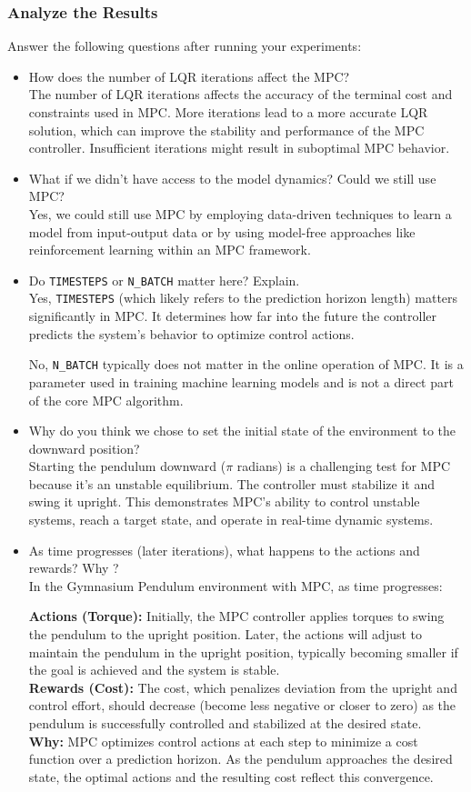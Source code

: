 \subsubsection{Analyze the Results} 
Answer the following questions after running your experiments: 
\begin{itemize} 
    \item How does the number of LQR iterations affect the MPC? \\
    The number of LQR iterations affects the accuracy of the terminal cost and constraints used in MPC. More iterations lead to a more accurate LQR solution, which can improve the stability and performance of the MPC controller. Insufficient iterations might result in suboptimal MPC behavior.
    \item What if we didn't have access to the model dynamics? Could we still use MPC? \\
    Yes, we could still use MPC by employing data-driven techniques to learn a model from input-output data or by using model-free approaches like reinforcement learning within an MPC framework.
    \item Do \texttt{TIMESTEPS} or \texttt{N\_BATCH} matter here? Explain.\\Yes, \texttt{TIMESTEPS} (which likely refers to the prediction horizon length) matters significantly in MPC. It determines how far into the future the controller predicts the system's behavior to optimize control actions.

    No, \texttt{N\_BATCH} typically does not matter in the online operation of MPC. It is a parameter used in training machine learning models and is not a direct part of the core MPC algorithm.     
    \item Why do you think we chose to set the initial state of the environment to the downward position?\\
    Starting the pendulum downward ($\pi$ radians) is a challenging test for MPC because it's an unstable equilibrium. The controller must stabilize it and swing it upright. This demonstrates MPC's ability to control unstable systems, reach a target state, and operate in real-time dynamic systems.
     \item As time progresses (later iterations), what happens to the actions and rewards? Why ?\\
     In the Gymnasium Pendulum environment with MPC, as time progresses:

\textbf{Actions (Torque):} Initially, the MPC controller applies torques to swing the pendulum to the upright position. Later, the actions will adjust to maintain the pendulum in the upright position, typically becoming smaller if the goal is achieved and the system is stable.\\
\textbf{Rewards (Cost):} The cost, which penalizes deviation from the upright and control effort, should decrease (become less negative or closer to zero) as the pendulum is successfully controlled and stabilized at the desired state.\\
\textbf{Why:} MPC optimizes control actions at each step to minimize a cost function over a prediction horizon. As the pendulum approaches the desired state, the optimal actions and the resulting cost reflect this convergence.
\end{itemize}